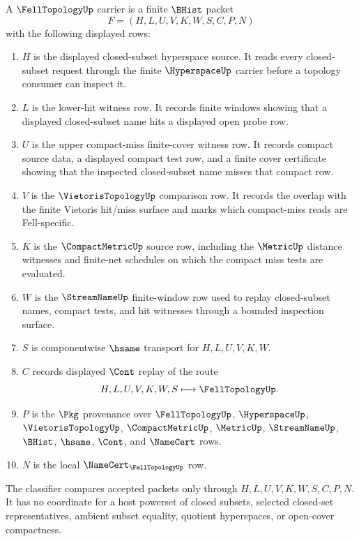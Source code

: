 \begin{definition}
\label{def:fell-topology-carrier}
A $\FellTopologyUp$ carrier is a finite $\BHist$ packet
$$
F=(H,L,U,V,K,W,S,C,P,N)
$$
with the following displayed rows:
\begin{enumerate}
\item $H$ is the displayed closed-subset hyperspace source. It reads every closed-subset request through the finite $\HyperspaceUp$ carrier before a topology consumer can inspect it.
\item $L$ is the lower-hit witness row. It records finite windows showing that a displayed closed-subset name hits a displayed open probe row.
\item $U$ is the upper compact-miss finite-cover witness row. It records compact source data, a displayed compact test row, and a finite cover certificate showing that the inspected closed-subset name misses that compact row.
\item $V$ is the $\VietorisTopologyUp$ comparison row. It records the overlap with the finite Vietoris hit/miss surface and marks which compact-miss reads are Fell-specific.
\item $K$ is the $\CompactMetricUp$ source row, including the $\MetricUp$ distance witnesses and finite-net schedules on which the compact miss tests are evaluated.
\item $W$ is the $\StreamNameUp$ finite-window row used to replay closed-subset names, compact tests, and hit witnesses through a bounded inspection surface.
\item $S$ is componentwise $\hsame$ transport for $H,L,U,V,K,W$.
\item $C$ records displayed $\Cont$ replay of the route
$$
H,L,U,V,K,W,S \longmapsto \FellTopologyUp .
$$
\item $P$ is the $\Pkg$ provenance over $\FellTopologyUp$, $\HyperspaceUp$, $\VietorisTopologyUp$, $\CompactMetricUp$, $\MetricUp$, $\StreamNameUp$, $\BHist$, $\hsame$, $\Cont$, and $\NameCert$ rows.
\item $N$ is the local $\NameCert_{\FellTopologyUp}$ row.
\end{enumerate}
The classifier compares accepted packets only through $H,L,U,V,K,W,S,C,P,N$. It has no coordinate for a host powerset of closed subsets, selected closed-set representatives, ambient subset equality, quotient hyperspaces, or open-cover compactness.
\end{definition}

